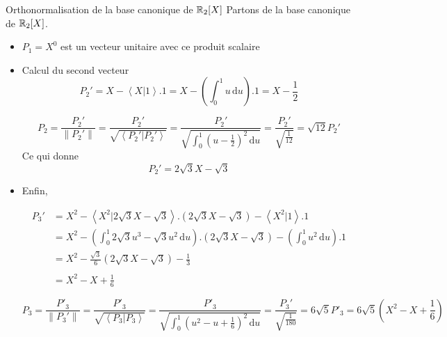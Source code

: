\documentclass{article}
\renewenvironment{question_kholle}[2][ ]
{
	\subsection{\texorpdfstring{#2}{}}
	\notblank{#1}
	{
		\noindent #1
		\bigbreak
	}
	{}
	\begin{proof}
}
{
	\end{proof}
}
\begin{document}
\begin{question_kholle}[{On utilisera le produit scalaire $$
          \left\langle P | Q \right\rangle  = \int_{0}^{1} P(u)Q(u) \, \mathrm du
        $$ }]{Orthonormalisation de la base canonique de $\mathbb R_2[X]$}
  Partons de la base canonique de $\mathbb R_{2}[X]$.
  \begin{itemize}[label=$\star$]
    \item $P_{1} =X^{0}$ est un vecteur unitaire avec ce produit scalaire

    \item Calcul du second vecteur
          $$
            P_{2}' = X - \left\langle X | 1 \right\rangle.1 = X - \left( \int_{0}^{1} u \, \mathrm du \right) .1 = X-\frac{1}{2}
          $$

          $$
            P_{2} = \frac{P_{2}'}{\|P_{2}'\|} = \frac{P_{2}'}{\sqrt{ \left\langle P_{2}' | P_{2}' \right\rangle  }}= \frac{P_{2}'}{\sqrt{ \int_{0}^{1} \left( u-\frac{1}{2} \right)^{2} \, \mathrm du }}
            = \frac{P_{2}'}{\sqrt{ \frac{1}{12} }}= \sqrt{ 12 }P_{2}'
          $$
          Ce qui donne
          $$
            P_{2}' = 2\sqrt{ 3 }X - \sqrt{ 3 }
          $$

    \item Enfin,

          \begin{align*}
            P_{3}' & = X^{2} - \left\langle X^{2} | 2\sqrt{ 3 }X-\sqrt{ 3 } \right\rangle.(2\sqrt{ 3 }X-\sqrt{ 3 })  - \left\langle X^{2} | 1 \right\rangle .1                            \\
                   & = X^{2} - \left( \int_{0}^{1} 2\sqrt{ 3 }u^{3} - \sqrt{ 3 }u^{2} \, \mathrm du  \right).(2\sqrt{ 3 }X-\sqrt{ 3 })-\left( \int_{0}^{1} u^{2} \, \mathrm du  \right).1 \\
                   & = X^{2} - \frac{\sqrt{ 3 }}{6}(2\sqrt{ 3 }X - \sqrt{ 3 }) - \frac{1}{3}                                                                                              \\ \\
                   & =X^{2} -X + \frac{1}{6}
          \end{align*}


          $$
            P_{3} = \frac{P'_{3}}{\|P_{3}'\|}= \frac{P'_{3}}{\sqrt{ \left\langle P_{3} | P_{3} \right\rangle  }}= \frac{P'_{3}}{\sqrt{ \int_{0}^{1} \left( u^{2}-u +\frac{1}{6} \right)^{2} \, \mathrm du }}
            = \frac{P_{3}'}{\sqrt{ \frac{1}{180} }} =6\sqrt{ 5 }P'_{3} = 6\sqrt{ 5 }\left( X^{2}-X + \frac{1}{6} \right)
          $$


\end{itemize}
\end{question_kholle}
\end{document}
